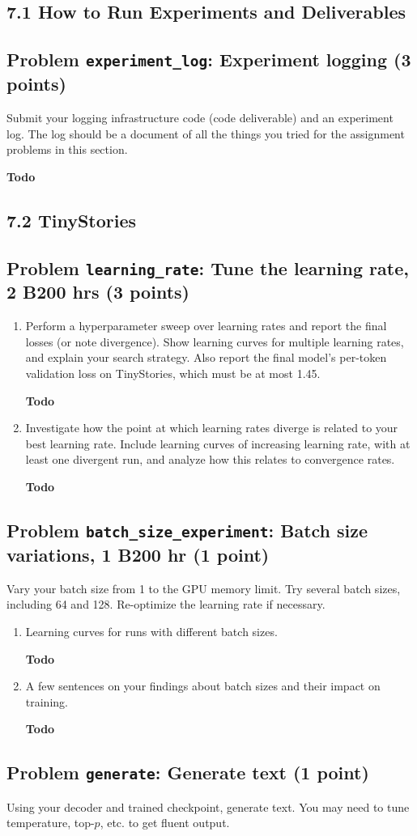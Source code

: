 \documentclass[11pt]{article}
\newcommand{\Todo}{\par\textbf{Todo}\par}
\newcommand{\problem}[2]{%
  \subsection*{Problem \texttt{#1}: #2}%
}
\begin{document}
\subsection*{7.1 How to Run Experiments and Deliverables}

\problem{experiment\_log}{Experiment logging (3 points)}

Submit your logging infrastructure code (code deliverable) and an experiment log. The log should be a document of all the things you tried for the assignment problems in this section.
\Todo

\subsection*{7.2 TinyStories}

\problem{learning\_rate}{Tune the learning rate, 2 B200 hrs (3 points)}

\begin{enumerate}[label=(\alph*)]
  \item Perform a hyperparameter sweep over learning rates and report the final losses (or note divergence). Show learning curves for multiple learning rates, and explain your search strategy. Also report the final model's per-token validation loss on TinyStories, which must be at most 1.45.
  \Todo
  \item Investigate how the point at which learning rates diverge is related to your best learning rate. Include learning curves of increasing learning rate, with at least one divergent run, and analyze how this relates to convergence rates.
  \Todo
\end{enumerate}

\problem{batch\_size\_experiment}{Batch size variations, 1 B200 hr (1 point)}

Vary your batch size from 1 to the GPU memory limit. Try several batch sizes, including 64 and 128. Re-optimize the learning rate if necessary.

\begin{enumerate}[label=(\alph*)]
  \item Learning curves for runs with different batch sizes.
  \Todo
  \item A few sentences on your findings about batch sizes and their impact on training.
  \Todo
\end{enumerate}

\problem{generate}{Generate text (1 point)}

Using your decoder and trained checkpoint, generate text. You may need to tune temperature, top-$p$, etc. to get fluent output.
\end{document}
